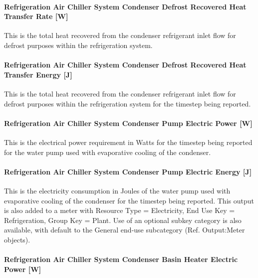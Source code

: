 \paragraph{Refrigeration Air Chiller System Condenser Defrost Recovered Heat Transfer Rate {[}W{]}}\label{refrigeration-air-chiller-system-condenser-defrost-recovered-heat-transfer-rate-w-1}

This is the total heat recovered from the condenser refrigerant inlet flow for defrost purposes within the refrigeration system.

\paragraph{Refrigeration Air Chiller System Condenser Defrost Recovered Heat Transfer Energy {[}J{]}}\label{refrigeration-air-chiller-system-condenser-defrost-recovered-heat-transfer-energy-j-1}

This is the total heat recovered from the condenser refrigerant inlet flow for defrost purposes within the refrigeration system for the timestep being reported.

\paragraph{Refrigeration Air Chiller System Condenser Pump Electric Power {[}W{]}}\label{refrigeration-air-chiller-system-condenser-pump-electric-power-w}

This is the electrical power requirement in Watts for the timestep being reported for the water pump used with evaporative cooling of the condenser.

\paragraph{Refrigeration Air Chiller System Condenser Pump Electric Energy {[}J{]}}\label{refrigeration-air-chiller-system-condenser-pump-electric-energy-j}

This is the electricity consumption in Joules of the water pump used with evaporative cooling of the condenser for the timestep being reported. This output is also added to a meter with Resource Type = Electricity, End Use Key = Refrigeration, Group Key = Plant. Use of an optional subkey category is also available, with default to the General end-use subcategory (Ref. Output:Meter objects).

\paragraph{Refrigeration Air Chiller System Condenser Basin Heater Electric Power {[}W{]}}\label{refrigeration-air-chiller-system-condenser-basin-heater-electric-power-w}

